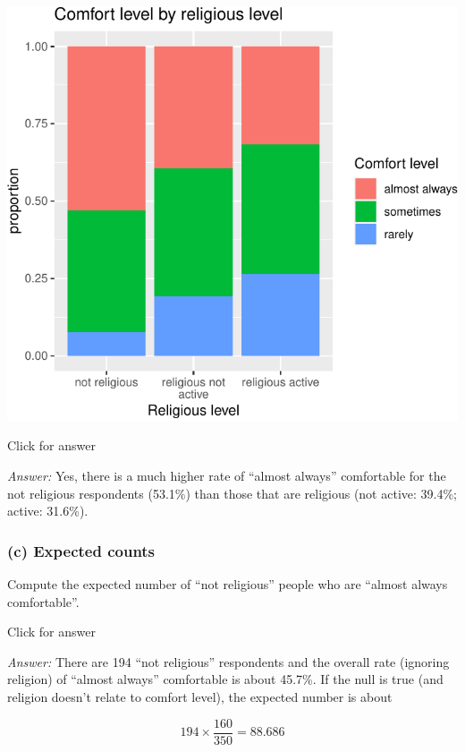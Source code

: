 \documentclass[
]{book}
\newenvironment{Shaded}{\begin{snugshade}}{\end{snugshade}}
\newcommand{\FunctionTok}[1]{\textcolor[rgb]{0.00,0.00,0.00}{#1}}
\newcommand{\NormalTok}[1]{#1}
\newcommand{\SpecialCharTok}[1]{\textcolor[rgb]{0.00,0.00,0.00}{#1}}
\begin{document}
\begin{center}\includegraphics[width=1\linewidth]{Class_Activity_22_files/figure-latex/unnamed-chunk-4-1} \end{center}

Click for answer

\emph{Answer:} Yes, there is a much higher rate of ``almost always'' comfortable for the not religious respondents (53.1\%) than those that are religious (not active: 39.4\%; active: 31.6\%).

\hypertarget{c-expected-counts}{%
\subsubsection{(c) Expected counts}\label{c-expected-counts}}

Compute the expected number of ``not religious'' people who are ``almost always comfortable''.

Click for answer

\emph{Answer:} There are 194 ``not religious'' respondents and the overall rate (ignoring religion) of ``almost always'' comfortable is about 45.7\%. If the null is true (and religion doesn't relate to comfort level), the expected number is about

\[194 \times \dfrac{160}{350} = 88.686\]

\begin{Shaded}
\end{Shaded}
\end{document}
